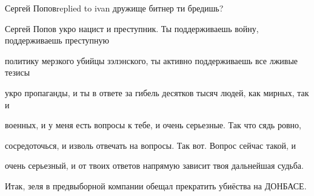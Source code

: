  
 
 
 
 

Сергей Поповreplied to ivan
дружище битнер ти бредишь?

Сергей Попов
укро нацист и преступник. Ты поддерживаешь войну, поддерживаешь преступную

политику мерзкого убийцы зэлэнского, ты активно поддерживаешь все лживые тезисы

укро пропаганды, и ты в ответе за гибель десятков тысяч людей, как мирных, так и

военных, и у меня есть вопросы к тебе, и очень серьезные. Так что сядь ровно,

сосредоточься, и изволь отвечать на вопросы. Так вот. Вопрос сейчас такой, и

очень серьезный, и от твоих ответов напрямую зависит твоя дальнейшая судьба.

Итак, зеля в предвыборной компании обещал прекратить убиёства на ДОНБАСЕ.
